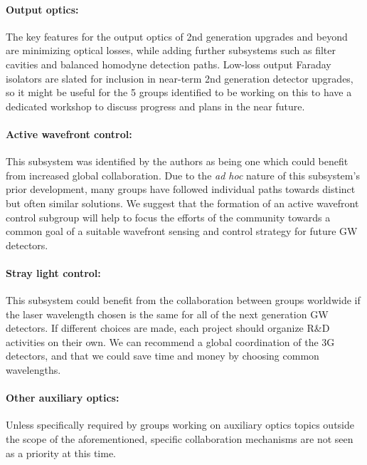 \paragraph{\bf Output optics:} The key features for the output optics of 2nd generation upgrades and beyond are minimizing optical losses, while adding further subsystems such as filter cavities and balanced homodyne detection paths. 
Low-loss output Faraday isolators are slated for inclusion in near-term 2nd generation detector upgrades, so it might be useful for the 5 groups identified to be working on this to have a dedicated workshop to discuss progress and plans in the near future. 

\paragraph{\bf Active wavefront control:} This subsystem was identified by the authors as being one which could benefit from increased global collaboration. Due to the \emph{ad hoc} nature of this subsystem's prior development, many groups have followed individual paths towards distinct but often similar solutions. We suggest that the formation of an active wavefront control subgroup will help to focus the efforts of the community towards a common goal of a suitable wavefront sensing and control strategy for future GW detectors. 

\paragraph{\bf Stray light control:} This subsystem could benefit from the collaboration between groups worldwide if the laser wavelength chosen is the same for all of the next generation GW detectors. If different choices are made, each project should organize R\&D activities on their own. We can recommend a global coordination of the 3G detectors, and that we could save time and money by choosing common wavelengths. 

\paragraph{\bf Other auxiliary optics:} Unless specifically required by groups working on auxiliary optics topics outside the scope of the aforementioned, specific collaboration mechanisms are not seen as a priority at this time. 

